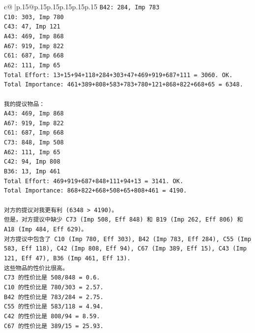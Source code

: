\documentclass{article}
\begin{document}
{\begin{supertabular}{c@{$\;$}|p{.15\linewidth}@{}p{.15\linewidth}p{.15\linewidth}p{.15\linewidth}p{.15\linewidth}p{.15\linewidth}}
{{{\texttt{B42: 284, Imp 783} \\
\texttt{C10: 303, Imp 780} \\
\texttt{C43: 47, Imp 121} \\
\texttt{A43: 469, Imp 868} \\
\texttt{A67: 919, Imp 822} \\
\texttt{C61: 687, Imp 668} \\
\texttt{A62: 111, Imp 65} \\
\texttt{Total Effort: 13+15+94+118+284+303+47+469+919+687+111 = 3060. OK.} \\
\texttt{Total Importance: 461+389+808+583+783+780+121+868+822+668+65 = 6348.} \\
\\ 
\texttt{我的提议物品：} \\
\texttt{A43: 469, Imp 868} \\
\texttt{A67: 919, Imp 822} \\
\texttt{C61: 687, Imp 668} \\
\texttt{C73: 848, Imp 508} \\
\texttt{A62: 111, Imp 65} \\
\texttt{C42: 94, Imp 808} \\
\texttt{B36: 13, Imp 461} \\
\texttt{Total Effort: 469+919+687+848+111+94+13 = 3141. OK.} \\
\texttt{Total Importance: 868+822+668+508+65+808+461 = 4190.} \\
\\ 
\texttt{对方的提议对我更有利 (6348 > 4190)。} \\
\texttt{但是，对方提议中缺少 C73 (Imp 508, Eff 848) 和 B19 (Imp 262, Eff 806) 和 A18 (Imp 484, Eff 629)。} \\
\texttt{对方提议中包含了 C10 (Imp 780, Eff 303), B42 (Imp 783, Eff 284), C55 (Imp 583, Eff 118), C42 (Imp 808, Eff 94), C67 (Imp 389, Eff 15), C43 (Imp 121, Eff 47), B36 (Imp 461, Eff 13).} \\
\texttt{这些物品的性价比很高。} \\
\texttt{C73 的性价比是 508/848 = 0.6.} \\
\texttt{C10 的性价比是 780/303 = 2.57.} \\
\texttt{B42 的性价比是 783/284 = 2.75.} \\
\texttt{C55 的性价比是 583/118 = 4.94.} \\
\texttt{C42 的性价比是 808/94 = 8.59.} \\
\texttt{C67 的性价比是 389/15 = 25.93.} \\
}}}
\end{supertabular}}
\end{document}
